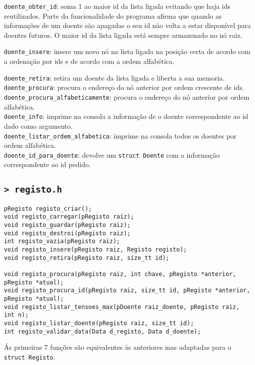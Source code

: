 \documentclass[a4paper, 12pt]{article}
\newcommand\code[1]{\texttt{\sloppy #1}}
\begin{document}
\code{doente\_obter\_id}: soma 1 ao maior id da lista ligada evitando que haja ids reutilizados. Parte da funcionalidade do programa afirma que quando as informações de um doente são apagadas o seu id não volta a estar disponível para doentes futuros. O maior id da lista ligada está sempre armazenado no nó raiz. 

\code{doente\_insere}: insere um novo nó na lista ligada na posição certa de acordo com a ordenação por ids e de acordo com a ordem alfabética.

\code{doente\_retira}: retira um doente da lista ligada e liberta a sua memoria.\\
\code{doente\_procura}: procura o endereço do nó anterior por ordem crescente de ids.\\
\code{doente\_procura\_alfabeticamente}: procura o endereço do nó anterior por ordem alfabética. \\
\code{doente\_info}: imprime na consola a informação de o doente correspondente ao id dado como argumento.\\
\code{doente\_listar\_ordem\_alfabetica}: imprime na consola todos os doentes por ordem alfabética.\\
\code{doente\_id\_para\_doente}: devolve um \code{struct Doente} com a informação correspondente ao id pedido.

\subsection*{\code{> registo.h}}

\begin{verbatim}
pRegisto registo_criar(); 
void registo_carregar(pRegisto raiz);
void registo_guardar(pRegisto raiz);
void registo_destroi(pRegisto raiz); 
int registo_vazia(pRegisto raiz); 
void registo_insere(pRegisto raiz, Registo registo); 
void registo_retira(pRegisto raiz, size_tt id);

void registo_procura(pRegisto raiz, int chave, pRegisto *anterior, pRegisto *atual);
void registo_procura_id(pRegisto raiz, size_tt id, pRegisto *anterior, pRegisto *atual);
void registo_listar_tensoes_max(pDoente raiz_doente, pRegisto raiz, int n); 
void registo_listar_doente(pRegisto raiz, size_tt id);
int registo_validar_data(Data d_registo, Data d_doente);
\end{verbatim}

Ás primeiras 7 funções são equivalentes às anteriores mas adaptadas para o \code{struct Registo}.
\end{document}
